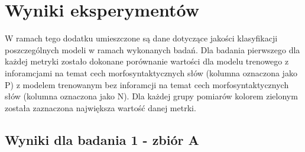 \section{Wyniki eksperymentów}

W ramach tego dodatku umieszczone są dane dotyczące jakości klasyfikacji poszczególnych modeli w ramach wykonanych badań. Dla badania pierwszego dla każdej metryki zostało dokonane porównanie wartości dla modelu trenowego z inforamcjami na temat cech morfosyntaktycznych słów (kolumna oznaczona jako P) z modelem trenowanym bez inforamcji na temat cech morfosyntaktycznych słów (kolumna oznaczona jako N). Dla każdej grupy pomiarów kolorem zielonym została zaznaczona największa wartość danej metrki.

\newpage
\subsection{\label{wyniki_eksperymentow_eks_1}Wyniki dla badania 1 - zbiór A}


